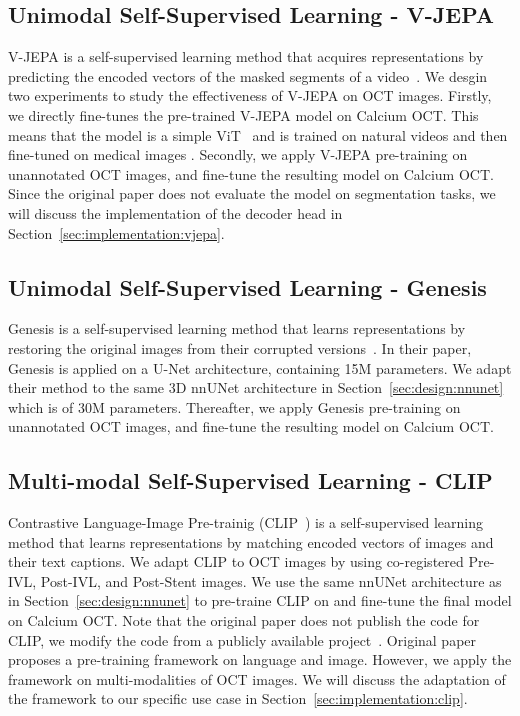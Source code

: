 \documentclass[a4paper,11pt,oneside]{report}
\begin{document}
\subsection{Unimodal Self-Supervised Learning - V-JEPA}
V-JEPA is a self-supervised learning method that acquires representations by predicting the encoded vectors of the masked segments of a video~\cite{Bardes2024Vjepa}. We desgin two experiments to study the effectiveness of V-JEPA on OCT images. Firstly, we directly fine-tunes the pre-trained V-JEPA model on Calcium OCT. This means that the model is a simple ViT~\cite{Dosovitskiy2020vit} and is trained on natural videos and then fine-tuned on medical images . Secondly, we apply V-JEPA pre-training on unannotated OCT images, and fine-tune the resulting model on Calcium OCT. Since the original paper does not evaluate the model on segmentation tasks, we will discuss the implementation of the decoder head in Section~\ref{sec:implementation:vjepa}.


\subsection{Unimodal Self-Supervised Learning - Genesis}
Genesis is a self-supervised learning method that learns representations by restoring the original images from their corrupted versions~\cite{Zhou2021}. In their paper, Genesis is applied on a U-Net architecture, containing 15M parameters. We adapt their method to the same 3D nnUNet architecture in Section~\ref{sec:design:nnunet} which is of 30M parameters. Thereafter, we apply Genesis pre-training on unannotated OCT images, and fine-tune the resulting model on Calcium OCT.


\subsection{Multi-modal Self-Supervised Learning - CLIP}
Contrastive Language-Image Pre-trainig (CLIP~\cite{Radford2021CLIP}) is a self-supervised learning method that learns representations by matching encoded vectors of images and their text captions. We adapt CLIP to OCT images by using co-registered Pre-IVL, Post-IVL, and Post-Stent images. We use the same nnUNet architecture as in Section~\ref{sec:design:nnunet} to pre-traine CLIP on and fine-tune the final model on Calcium OCT. Note that the original paper does not publish the code for CLIP, we modify the code from a publicly available project~\cite{Shariatnia2021}. Original paper proposes a pre-training framework on language and image. However, we apply the framework on multi-modalities of OCT images. We will discuss the adaptation of the framework to our specific use case in Section~\ref{sec:implementation:clip}.
\end{document}
